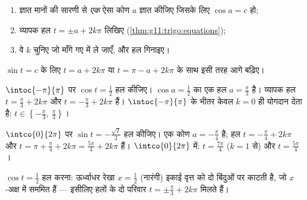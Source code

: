 \begin{method}[किसी अंतराल पर $\cos t = c$ हल करना]\label{met:g11:trigo:solve}
\begin{enumerate}
  \item ज्ञात मानों की सारणी से \emph{एक} ऐसा कोण $a$ ज्ञात कीजिए जिसके
        लिए $\cos a = c$ हो;
  \item व्यापक हल $t = \pm a + 2k\pi$ लिखिए (\cref{thm:g11:trigo:equations});
  \item वे  $k$ चुनिए जो माँगे गए  में ले जाएँ, और हल
        गिनाइए।
\end{enumerate}
$\sin t = c$ के लिए $t = a + 2k\pi$ या $t = \pi - a + 2k\pi$ के साथ इसी तरह आगे बढ़िए।
\end{method}

\begin{example}\label{ex:g11:trigo:solve}
$\intoc{-\pi}{\pi}$ पर $\cos t = \frac12$ हल कीजिए। $\cos a = \frac12$ का एक हल $a = \frac{\pi}{3}$ है। व्यापक हल $t = \frac\pi3 + 2k\pi$ और $t = -\frac\pi3 + 2k\pi$
हैं। $\intoc{-\pi}{\pi}$ के भीतर केवल $k = 0$ ही योगदान देता है: $t \in \left\{-\frac\pi3,\ \frac\pi3\right\}$।

$\intco{0}{2\pi}$ पर $\sin t = -\frac{\sqrt2}{2}$ हल कीजिए। एक कोण $a = -\frac\pi4$ है; हल $t = -\frac\pi4 + 2k\pi$ और $t = \pi + \frac\pi4 + 2k\pi = \frac{5\pi}{4} + 2k\pi$ हैं। $\intco{0}{2\pi}$ में:
$t = \frac{7\pi}{4}$ ($k = 1$ से) और $t = \frac{5\pi}{4}$।
\end{example}

\begin{omfigure}

{\small $\cos t = \frac12$ हल करना: ऊर्ध्वाधर रेखा $x = \frac12$ (नारंगी) इकाई वृत्त को दो
बिंदुओं पर काटती है, जो $x$-अक्ष में सममित हैं --- इसीलिए हलों के दो
परिवार $t = \pm\frac\pi3 + 2k\pi$ मिलते हैं।}
\end{omfigure}


